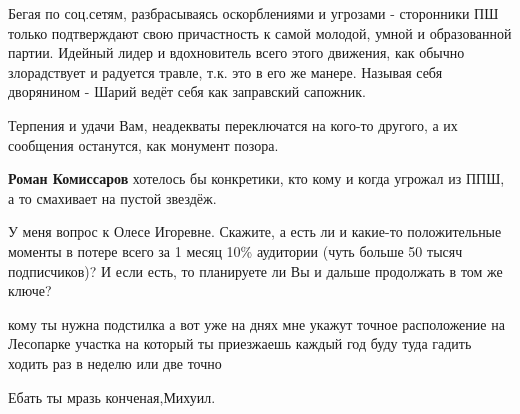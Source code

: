 \begin{itemize}
Бегая по соц.сетям, разбрасываясь оскорблениями и угрозами - сторонники ПШ
только подтверждают свою причастность к самой молодой, умной и образованной
партии. Идейный лидер и вдохновитель всего этого движения, как обычно
злорадствует и радуется травле, т.к. это в его же манере. Называя себя
дворянином - Шарий ведёт себя как заправский сапожник.

Терпения и удачи Вам, неадекваты переключатся на кого-то другого, а их
сообщения останутся, как монумент позора.

\begin{itemize}
 
\textbf{Роман Комиссаров} хотелось бы конкретики, кто кому и когда угрожал из ППШ, а то смахивает на пустой звездёж.
\end{itemize}

 

У меня вопрос к Олесе Игоревне. Скажите, а есть ли и какие-то положительные
моменты в потере всего за 1 месяц 10\% аудитории (чуть больше 50 тысяч
подписчиков)? И если есть, то планируете ли Вы и дальше продолжать в том же
ключе?


 

кому ты нужна подстилка а вот уже на днях мне укажут точное расположение на
Лесопарке участка на который ты приезжаешь каждый год буду туда гадить ходить
раз в неделю или две точно

\begin{itemize}
 
Ебать ты мразь конченая,Михуил.
\end{itemize}


\end{itemize}
